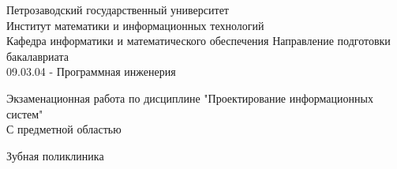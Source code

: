 \documentclass[a4paper,12pt]{article}
\renewcommand{\baselinestretch}{1.50}
\begin{document}

\thispagestyle{empty}

\begin{center}
	
	
	\renewcommand{\baselinestretch}{1}
	{\large
		{\sc Петрозаводский государственный университет\\
			Институт математики и информационных технологий\\
			Кафедра информатики и математического обеспечения}
		}
	Направление подготовки бакалавриата \\ 09.03.04 - Программная инженерия	
\end{center}
 
\vfill

\begin{center}
{\normalsize Экзаменационная работа по дисциплине "Проектирование информационных систем"\\ С предметной областью } \\

\medskip

{\Large \sc  Зубная поликлиника \\
	 
}
 
\end{center}

\medskip
\end{document}
